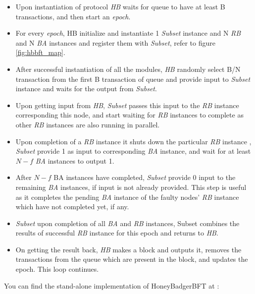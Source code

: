 \begin{itemize}
    \item Upon instantiation of protocol \textit{HB} waits for queue to have at least B transactions, and then start an \textit{epoch}.
    \item For every \textit{epoch}, HB initialize and instantiate 1 \textit{Subset} instance and N \textit{RB} and N \textit{BA} instances and register them with \textit{Subset}, refer to figure \ref{fig:hbbft_map}.
    \item After successful instantiation of all the modules, \textit{HB} randomly select B/N transaction from the first B transaction of queue and provide input to \textit{Subset} instance and waits for the output from \textit{Subset}.
    \item Upon getting input from \textit{HB}, \textit{Subset} passes this input to the \textit{RB} instance corresponding this node, and start waiting for \textit{RB} instances to complete as other \textit{RB} instances are also running in parallel.
    \item Upon completion of a \textit{RB} instance it shuts down the particular \textit{RB} instance , \textit{Subset} provide 1 as input to corresponding \textit{BA} instance, and wait for at least $N-f$ \textit{BA} instances to output 1.
    \item After $N-f$ {BA} instances have completed, \textit{Subset} provide 0 input to the remaining \textit{BA} instances, if input is not already provided. This step is useful as it completes the pending \textit{BA} instance of the faulty nodes' \textit{RB} instance which have not completed yet, if any.
  \item  \textit{Subset} upon completion of all \textit{BA} and \textit{RB} instances, Subset combines the results of successful \textit{RB} instance for this epoch and returns to \textit{HB}.
    \item On getting the result back, \textit{HB} makes a block and outputs it, removes the transactions from the queue which are present in the block, and updates the epoch. This loop continues.
    
\end{itemize}
You can find the stand-alone implementation of HoneyBadgerBFT at 
: 

